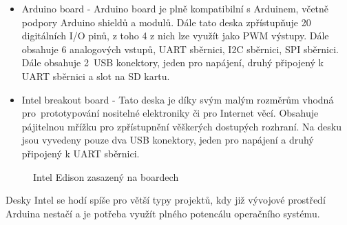 			\begin{itemize}
				\item Arduino board - Arduino board je plně kompatibilní s Arduinem, včetně podpory Arduino shieldů a modulů. Dále tato deska zpřístupňuje 20 digitálních I/O pinů, z toho 4 z nich lze využít jako PWM výstupy. Dále obsahuje 6 analogových vstupů, UART sběrnici, I2C sběrnici, SPI sběrnici. Dále obsahuje 2~USB konektory, jeden pro napájení, druhý připojený k UART sběrnici a slot na SD kartu.
				\item Intel breakout board -  Tato deska je díky svým malým rozměrům vhodná pro~prototypování nositelné elektroniky či pro Internet věcí. Obsahuje pájitelnou mřížku pro zpřístupnění věškerých dostupých rozhraní. Na desku jsou vyvedeny pouze dva USB konektory, jeden pro napájení a druhý připojený k UART sběrnici.
\end{itemize}


\begin{figure}[!ht]
    \vspace{-20pt}
		\centering
			\hspace*{5mm}
		\caption{Intel Edison zasazený na boardech}
		\vspace{-10pt}
\end{figure}
	

Desky Intel se hodí spíše pro větší typy projektů, kdy již vývojové prostředí Arduina nestačí a je potřeba využít plného potencálu operačního systému.


